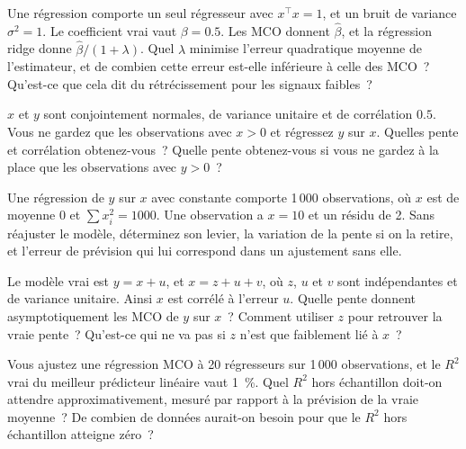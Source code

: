 \begin{question}\label{iq:iv1:regression:24}
Une régression comporte un seul régresseur avec $x^\top x = 1$, et un bruit de variance $\sigma^2 = 1$. Le coefficient vrai vaut $\beta = 0.5$. Les MCO donnent $\hat\beta$, et la régression ridge donne $\hat\beta/(1 + \lambda)$. Quel $\lambda$ minimise l'erreur quadratique moyenne de l'estimateur, et de combien cette erreur est-elle inférieure à celle des MCO~? Qu'est-ce que cela dit du rétrécissement pour les signaux faibles~?
\end{question}

\begin{question}\label{iq:iv1:regression:25}
$x$ et $y$ sont conjointement normales, de variance unitaire et de corrélation $0.5$. Vous ne gardez que les observations avec $x > 0$ et régressez $y$ sur $x$. Quelles pente et corrélation obtenez-vous~? Quelle pente obtenez-vous si vous ne gardez à la place que les observations avec $y > 0$~?
\end{question}

\begin{question}\label{iq:iv1:regression:26}
Une régression de $y$ sur $x$ avec constante comporte 1\,000 observations, où $x$ est de moyenne 0 et $\sum x_i^2 = 1000$. Une observation a $x = 10$ et un résidu de 2. Sans réajuster le modèle, déterminez son levier, la variation de la pente si on la retire, et l'erreur de prévision qui lui correspond dans un ajustement sans elle.
\end{question}

\begin{question}\label{iq:iv1:regression:27}
Le modèle vrai est $y = x + u$, et $x = z + u + v$, où $z$, $u$ et $v$ sont indépendantes et de variance unitaire. Ainsi $x$ est corrélé à l'erreur $u$. Quelle pente donnent asymptotiquement les MCO de $y$ sur $x$~? Comment utiliser $z$ pour retrouver la vraie pente~? Qu'est-ce qui ne va pas si $z$ n'est que faiblement lié à $x$~?
\end{question}

\begin{question}\label{iq:iv1:regression:28}
Vous ajustez une régression MCO à 20 régresseurs sur 1\,000 observations, et le $R^2$ vrai du meilleur prédicteur linéaire vaut 1~\%. Quel $R^2$ hors échantillon doit-on attendre approximativement, mesuré par rapport à la prévision de la vraie moyenne~? De combien de données aurait-on besoin pour que le $R^2$ hors échantillon atteigne zéro~?
\end{question}

